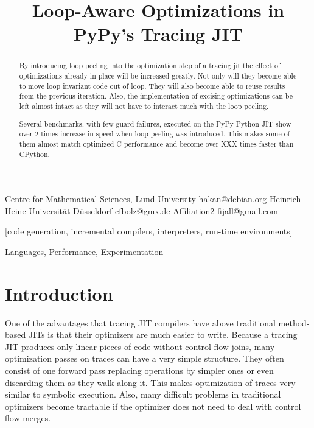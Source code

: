 \documentclass[preprint]{sigplanconf}
\begin{document}
\copyrightdata{[to be supplied]} 


\title{Loop-Aware Optimizations in PyPy's Tracing JIT}

           {Centre for Mathematical Sciences, Lund University}
           {hakan@debian.org}
           {Heinrich-Heine-Universität Düsseldorf}
           {cfbolz@gmx.de}
           {Affiliation2}
           {fijall@gmail.com}

\maketitle

\begin{abstract}
By introducing loop peeling into the optimization step of a tracing
jit the effect of optimizations already in place will be increased
greatly. Not only will they become able to move loop invariant code
out of loop. They will also become able to reuse results from the
previous iteration. Also, the implementation of excising optimizations
can be left almost intact as they will not have to interact much with
the loop peeling.

Several benchmarks, with few guard failures, executed on the
PyPy Python JIT show over 2
times increase in speed when loop peeling was introduced. This makes
some of them almost match optimized C performance and become over XXX
times faster than CPython.
\end{abstract}

[code generation,
incremental compilers, interpreters, run-time environments]

\terms
Languages, Performance, Experimentation


\section{Introduction}

One of the advantages that tracing JIT compilers have above traditional
method-based
JITs is that their optimizers are much easier to write. Because a tracing JIT
produces only linear pieces of code without control flow joins, many
optimization passes on traces can have a very simple structure. They often
consist of one forward pass replacing operations by simpler ones or even
discarding them as they walk along it. This makes
optimization of traces very similar to symbolic execution. Also, many
difficult problems in traditional optimizers become tractable if the optimizer
does not need to deal with control flow merges.
\end{document}
